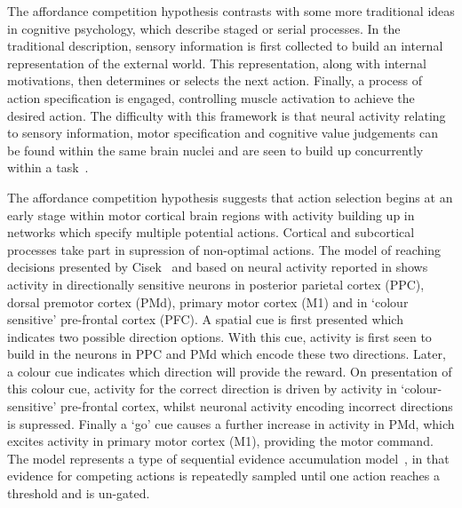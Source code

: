 \documentclass[10pt,letterpaper]{article}
\begin{document}
The affordance competition hypothesis contrasts with some more
traditional ideas in cognitive psychology, which describe staged or
serial processes. In the traditional description, sensory information
is first collected to build an internal representation of the external
world.  This representation, along with internal motivations, then
determines or selects the next action. Finally, a process of action
specification is engaged, controlling muscle activation to achieve the
desired action. The difficulty with this framework is that neural
activity relating to sensory information, motor specification and
cognitive value judgements can be found within the same brain nuclei
and are seen to build up concurrently within a
task~\cite{cisek_neural_2005,schall_neural_1993}.

The affordance competition hypothesis suggests that action selection
begins at an early stage within motor cortical brain regions with
activity building up in networks which specify multiple potential
actions. Cortical and subcortical~\cite{humphries_role_2002} processes
take part in supression of non-optimal actions. The model of reaching
decisions presented by Cisek~\cite{cisek_cortical_2007} and based on
neural activity reported in \cite{cisek_neural_2005} shows activity in
directionally sensitive neurons in posterior parietal cortex (PPC),
dorsal premotor cortex (PMd), primary motor cortex (M1) and in `colour
sensitive' pre-frontal cortex (PFC). A spatial cue is first presented
which indicates two possible direction options. With this cue,
activity is first seen to build in the neurons in PPC and PMd which
encode these two directions. Later, a colour cue indicates which
direction will provide the reward. On presentation of this colour cue,
activity for the correct direction is driven by activity in
`colour-sensitive' pre-frontal cortex, whilst neuronal activity
encoding incorrect directions is supressed. Finally a `go' cue causes
a further increase in activity in PMd, which excites activity in
primary motor cortex (M1), providing the motor command. The model
represents a type of sequential evidence accumulation
model~\cite{bogacz_physics_2006}, in that evidence for competing
actions is repeatedly sampled until one action reaches a threshold and
is un-gated.
\end{document}
